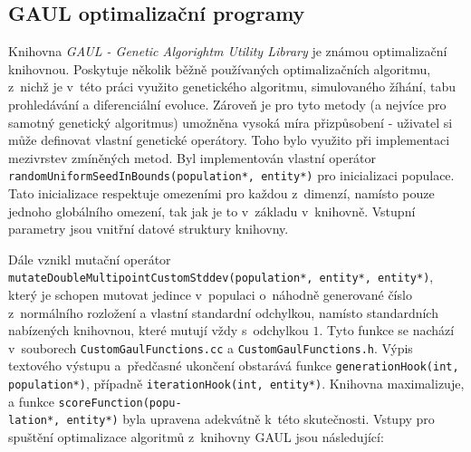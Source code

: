 \subsection*{GAUL optimalizační programy}
Knihovna \emph{GAUL - Genetic Algorightm Utility Library} je známou optimalizační knihovnou. Poskytuje několik běžně používaných optimalizačních algoritmu, z~nichž je v~této práci využito genetického algoritmu, simulovaného žíhání, tabu prohledávání a diferenciální evoluce. Zároveň je pro tyto metody (a nejvíce pro samotný genetický algoritmus) umožněna vysoká míra přizpůsobení - uživatel si může definovat vlastní genetické operátory. Toho bylo využito při implementaci mezivrstev zmíněných metod. Byl implementován vlastní operátor \texttt{randomUniformSeedInBounds(population*, entity*)} pro inicializaci populace. Tato inicializace respektuje omezeními pro každou z~dimenzí, namísto pouze jednoho globálního omezení, tak jak je to v~základu v~knihovně. Vstupní parametry jsou vnitřní datové struktury knihovny.

Dále vznikl mutační operátor \texttt{mutateDoubleMultipointCustomStddev(population*, entity*, entity*)}, který je schopen mutovat jedince v~populaci o~náhodně generované číslo z~normálního rozložení a vlastní standardní odchylkou, namísto standardních nabízených knihovnou, které mutují vždy s~odchylkou $1$. Tyto funkce se nachází v~souborech \texttt{CustomGaulFunctions.cc} a \texttt{CustomGaulFunctions.h}. Výpis textového výstupu a~předčasné ukončení obstarává funkce \texttt{generationHook(int, population*)}, případně \texttt{iterationHook(int, entity*)}. Knihovna maximalizuje, a funkce \texttt{scoreFunction(popu-\\lation*, entity*)} byla upravena adekvátně k~této skutečnosti. 
Vstupy pro spuštění optimalizace algoritmů z~knihovny GAUL jsou následující: 

